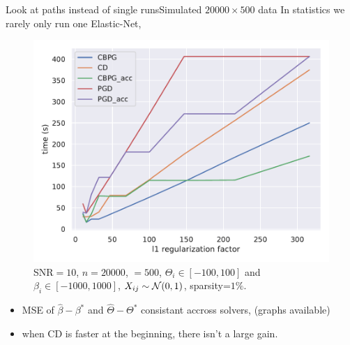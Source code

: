 \documentclass[10pt,aspectratio=43]{beamer}
\begin{document}
\begin{frame}{Look at paths instead of single runs}{Simulated $20000\times 500$ data}
In statistics we rarely only run one Elastic-Net,
    \begin{figure}[ht]
        \centering
        \includegraphics[scale=.35]{prebuilt_images/simu_total/simulated_n20000p500_snr=10_TIME_2605.pdf}
        \caption{SNR$=10$, $n=20000$, $=500$, $\Theta_i\in [-100, 100]$ and $\beta_i\in[-1000, 1000]$, $X_{ij}\sim\mathcal{N}(0, 1)$, sparsity=$1\%$.}
    \end{figure}

    \begin{itemize}
        \item MSE of $\hat\beta - \beta^*$ and $\hat \Theta - \Theta^*$ consistant accross solvers, (graphs available)
        \item when CD is faster at the beginning, there isn't a large gain.
    \end{itemize}
\end{frame}
\end{document}
